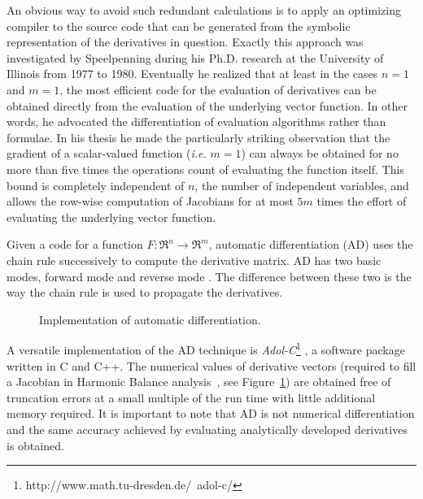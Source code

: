 An obvious way to avoid such redundant calculations is to apply an
optimizing compiler to the source code that can be generated from the
symbolic representation of the derivatives in question. Exactly this
approach was investigated by Speelpenning during his Ph.D. research
\cite{speelpenning} at the University of Illinois from 1977 to
1980. Eventually he realized that at least in the cases $n = 1$ and $m
= 1$, the most efficient code for the evaluation of derivatives can be
obtained directly from the evaluation of the underlying vector
function. In other words, he advocated the differentiation of
evaluation algorithms rather than formulae. In his thesis he made the
particularly striking observation that the gradient of a scalar-valued
function (\emph{i.e.} $m = 1$) can always be obtained for no more than
five times the operations count of evaluating the function
itself. This bound is completely independent of $n$, the number of
independent variables, and allows the row-wise computation of
Jacobians for at most $5 m$ times the effort of evaluating the
underlying vector function.

Given a code for a function $F : \Re^n \rightarrow \Re^m$, automatic
differentiation (AD) uses the chain rule successively to compute the
derivative matrix. AD has two basic modes, forward mode and reverse
mode \cite{coleman}. The difference between these two is the way the
chain rule is used to propagate the derivatives. 

%
\begin{figure}[htpb]
\centerline{\epsfxsize=12cm }
\caption{Implementation of automatic differentiation.} \label{fig:adolc}
\end{figure}
%

A versatile implementation of the AD technique is
\emph{Adol-C}\footnote{http://www.math.tu-dresden.de/~adol-c/}
\cite{adol-c:96}, a software package written in C and C++.  The
numerical values of derivative vectors (required to fill a Jacobian in
Harmonic Balance analysis~\cite{svhb}, see Figure~\ref{fig:adolc}) are
obtained free of truncation errors at a small multiple of the run time
with little additional memory required.  It is important to note that
AD is not numerical differentiation and the same accuracy achieved by
evaluating analytically developed derivatives is obtained.

